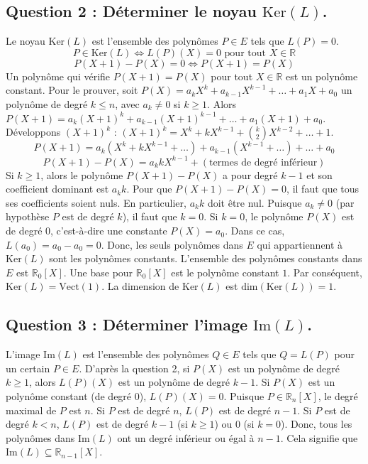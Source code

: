 \documentclass{report}
\begin{document}
\subsection*{Question 2 : Déterminer le noyau $\mathrm{Ker}(L)$.}

Le noyau $\mathrm{Ker}(L)$ est l'ensemble des polynômes $P \in E$ tels que $L(P) = 0$.
$$P \in \mathrm{Ker}(L) \iff L(P)(X) = 0 \text{ pour tout } X \in \mathbb{R}$$
$$P(X+1) - P(X) = 0 \iff P(X+1) = P(X)$$
Un polynôme qui vérifie $P(X+1) = P(X)$ pour tout $X \in \mathbb{R}$ est un polynôme constant.
Pour le prouver, soit $P(X) = a_k X^k + a_{k-1} X^{k-1} + \dots + a_1 X + a_0$ un polynôme de degré $k \le n$, avec $a_k \neq 0$ si $k \ge 1$.
Alors $P(X+1) = a_k (X+1)^k + a_{k-1} (X+1)^{k-1} + \dots + a_1 (X+1) + a_0$.
Développons $(X+1)^k$ : $(X+1)^k = X^k + k X^{k-1} + \binom{k}{2} X^{k-2} + \dots + 1$.
$$P(X+1) = a_k (X^k + k X^{k-1} + \dots) + a_{k-1} (X^{k-1} + \dots) + \dots + a_0$$
$$P(X+1) - P(X) = a_k k X^{k-1} + (\text{termes de degré inférieur})$$
Si $k \ge 1$, alors le polynôme $P(X+1) - P(X)$ a pour degré $k-1$ et son coefficient dominant est $a_k k$.
Pour que $P(X+1) - P(X) = 0$, il faut que tous ses coefficients soient nuls. En particulier, $a_k k$ doit être nul.
Puisque $a_k \neq 0$ (par hypothèse $P$ est de degré $k$), il faut que $k=0$.
Si $k=0$, le polynôme $P(X)$ est de degré 0, c'est-à-dire une constante $P(X) = a_0$.
Dans ce cas, $L(a_0) = a_0 - a_0 = 0$.
Donc, les seuls polynômes dans $E$ qui appartiennent à $\mathrm{Ker}(L)$ sont les polynômes constants.
L'ensemble des polynômes constants dans $E$ est $\mathbb{R}_0[X]$.
Une base pour $\mathbb{R}_0[X]$ est le polynôme constant $1$.
Par conséquent, $\mathrm{Ker}(L) = \mathrm{Vect}(1)$.
La dimension de $\mathrm{Ker}(L)$ est $\mathrm{dim}(\mathrm{Ker}(L)) = 1$.

\subsection*{Question 3 : Déterminer l'image $\mathrm{Im}(L)$.}

L'image $\mathrm{Im}(L)$ est l'ensemble des polynômes $Q \in E$ tels que $Q = L(P)$ pour un certain $P \in E$.
D'après la question 2, si $P(X)$ est un polynôme de degré $k \ge 1$, alors $L(P)(X)$ est un polynôme de degré $k-1$.
Si $P(X)$ est un polynôme constant (de degré 0), $L(P)(X) = 0$.
Puisque $P \in \mathbb{R}_n[X]$, le degré maximal de $P$ est $n$.
Si $P$ est de degré $n$, $L(P)$ est de degré $n-1$.
Si $P$ est de degré $k < n$, $L(P)$ est de degré $k-1$ (si $k \ge 1$) ou 0 (si $k=0$).
Donc, tous les polynômes dans $\mathrm{Im}(L)$ ont un degré inférieur ou égal à $n-1$.
Cela signifie que $\mathrm{Im}(L) \subseteq \mathbb{R}_{n-1}[X]$.
\end{document}
